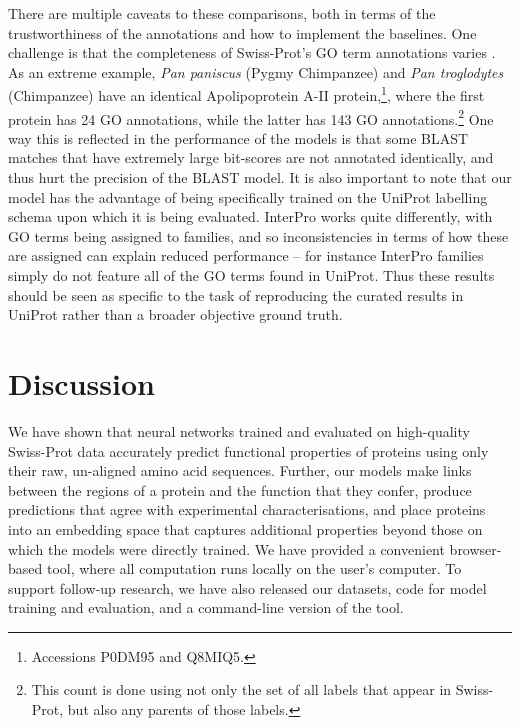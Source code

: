 There are multiple caveats to these comparisons, both in terms of the trustworthiness of the annotations and how to implement the baselines. One challenge is that the completeness of Swiss-Prot's GO term annotations varies \cite{jiang2014impact}. As an extreme example, \textit{Pan paniscus} (Pygmy Chimpanzee) and \textit{Pan troglodytes} (Chimpanzee) have an identical Apolipoprotein A-II protein,\footnote{Accessions P0DM95 and Q8MIQ5.}, where the first protein has 24 GO annotations, while the latter has 143 GO annotations.\footnote{This count is done using not only the set of all labels that appear in Swiss-Prot, but also any parents of those labels.} One way this is reflected in the performance of the models is that some BLAST matches that have extremely large bit-scores are not annotated identically, and thus hurt the precision of the BLAST model. It is also important to note that our model has the advantage of being specifically trained on the UniProt labelling schema upon which it is being evaluated. InterPro works quite differently, with GO terms being assigned to families, and so inconsistencies in terms of how these are assigned can explain reduced performance -- for instance InterPro families simply do not feature all of the GO terms found in UniProt. Thus these results should be seen as specific to the task of reproducing the curated results in UniProt rather than a broader objective ground truth.

\section*{Discussion}

We have shown that neural networks trained and evaluated on high-quality Swiss-Prot data accurately predict functional properties of proteins using only their raw, un-aligned amino acid sequences. Further, our models make links between the regions of a protein and the function that they confer, produce predictions that agree with experimental characterisations, and place proteins into an embedding space that captures additional properties beyond those on which the models were directly trained. We have provided a convenient browser-based tool, where all computation runs locally on the user's computer. To support follow-up research, we have also released our datasets, code for model training and evaluation, and a command-line version of the tool.

